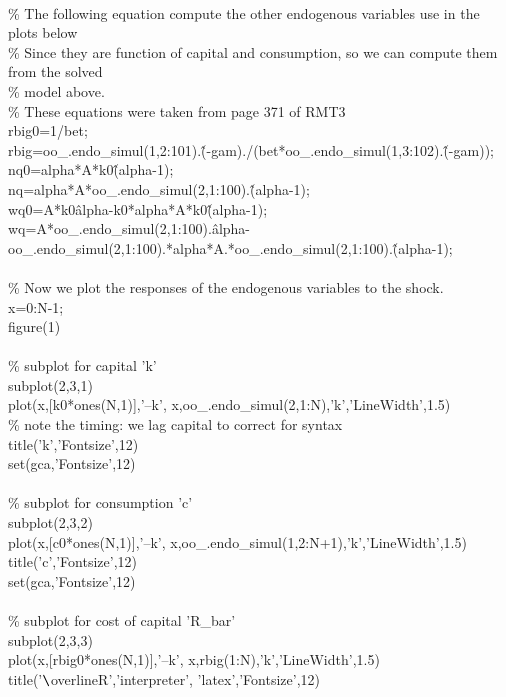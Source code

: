 \documentclass[a4paper,12pt]{scrartcl} %
\begin{document}
\\
\% The following equation compute the other endogenous variables use in the plots below\\
\% Since they are function of capital and consumption, so we can compute them from the solved\\
\% model above.\\
\% These equations were taken from page 371 of RMT3\\
rbig0=1/bet;\\
rbig=oo\_.endo\_simul(1,2:101).\^(-gam)./(bet*oo\_.endo\_simul(1,3:102).\^(-gam));\\
nq0=alpha*A*k0\^(alpha-1);\\
nq=alpha*A*oo\_.endo\_simul(2,1:100).\^(alpha-1);\\
wq0=A*k0\^alpha-k0*alpha*A*k0\^(alpha-1);\\
wq=A*oo\_.endo\_simul(2,1:100).\^alpha-oo\_.endo\_simul(2,1:100).*alpha*A.*oo\_.endo\_simul(2,1:100).\^(alpha-1);\\
\\
\% Now we plot the responses of the endogenous variables to the shock.\\
x=0:N-1;\\
figure(1)\\
\\
\% subplot for capital 'k'\\
subplot(2,3,1)\\
plot(x,[k0*ones(N,1)],'--k', x,oo\_.endo\_simul(2,1:N),'k','LineWidth',1.5)\\
\% note the timing: we lag capital to correct for syntax\\
title('k','Fontsize',12)\\
set(gca,'Fontsize',12)\\
\\
\% subplot for consumption 'c'\\
subplot(2,3,2)\\
plot(x,[c0*ones(N,1)],'--k', x,oo\_.endo\_simul(1,2:N+1),'k','LineWidth',1.5)\\
title('c','Fontsize',12)\\
set(gca,'Fontsize',12)\\
\\
\% subplot for cost of capital 'R\_bar'\\
subplot(2,3,3)\\
plot(x,[rbig0*ones(N,1)],'--k', x,rbig(1:N),'k','LineWidth',1.5)\\
title('$\verb|\|$overline{R}','interpreter', 'latex','Fontsize',12)\\
\end{document}
